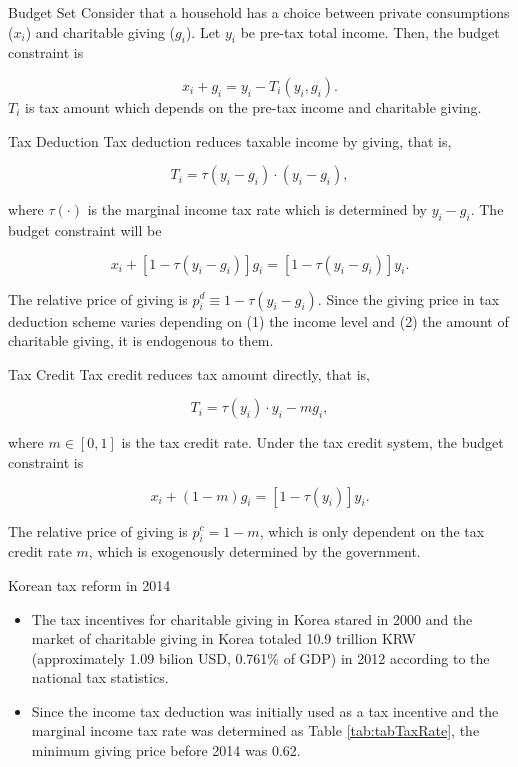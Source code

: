\documentclass[
  ignorenonframetext,
]{beamer}
\providecommand{\tightlist}{%
  \setlength{\itemsep}{0pt}\setlength{\parskip}{0pt}}
\begin{document}
\begin{frame}{Budget Set}
\protect\hypertarget{budget-set}{}
Consider that a household has a choice between private consumptions (\(x_i\)) and charitable giving (\(g_i\)). Let \(y_i\) be pre-tax total income.
Then, the budget constraint is

\[
    x_i + g_i = y_i - T_i(y_i, g_i).
\]
\(T_i\) is tax amount which depends on the pre-tax income and charitable giving.
\end{frame}

\begin{frame}{Tax Deduction}
\protect\hypertarget{tax-deduction}{}
Tax deduction reduces taxable income by giving, that is,

\[
    T_i = \tau(y_i - g_i) \cdot (y_i - g_i),
\]

where \(\tau(\cdot)\) is the marginal income tax rate which is determined by \(y_i - g_i\). The budget constraint will be

\[
    x_i + [1 - \tau(y_i - g_i)]g_i = [1 - \tau(y_i - g_i)] y_i.
\]

The relative price of giving is \(p_i^{d} \equiv 1 - \tau(y_i - g_i)\).
Since the giving price in tax deduction scheme varies depending on (1) the income level and (2) the amount of charitable giving, it is endogenous to them.
\end{frame}

\begin{frame}{Tax Credit}
\protect\hypertarget{tax-credit}{}
Tax credit reduces tax amount directly, that is,

\[
    T_i = \tau(y_i)\cdot y_i - m g_i,
\]

where \(m \in [0, 1]\) is the tax credit rate. Under the tax credit system, the budget constraint is

\[
    x_i + (1 - m) g_i = [1 - \tau(y_i)] y_i.
\]

The relative price of giving is \(p_i^c = 1 - m\),
which is only dependent on the tax credit rate \(m\), which is exogenously determined by the government.
\end{frame}

\begin{frame}{Korean tax reform in 2014}
\protect\hypertarget{korean-tax-reform-in-2014}{}
\begin{itemize}
\tightlist
\item
  The tax incentives for charitable giving in Korea stared in 2000 and the market of charitable giving in Korea totaled 10.9 trillion KRW (approximately 1.09 bilion USD, 0.761\% of GDP) in 2012 according to the national tax statistics.
\item
  Since the income tax deduction was initially used as a tax incentive and the marginal income tax rate was determined as Table \ref{tab:tabTaxRate}, the minimum giving price before 2014 was 0.62.
\end{itemize}
\end{frame}
\end{document}
